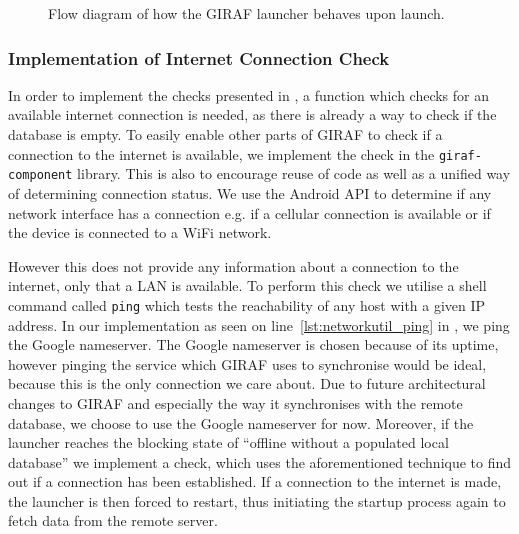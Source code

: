 \begin{figure}[h]
    \centering
    
    \caption{Flow diagram of how the GIRAF launcher behaves upon launch.}\label{fig:launcher_offline_flow}
\end{figure}

\subsubsection{Implementation of Internet Connection Check}
In order to implement the checks presented in , a function which checks for an available internet connection is needed, as there is already a way to check if the database is empty.
To easily enable other parts of GIRAF to check if a connection to the internet is available, we implement the check in the \texttt{giraf-component} library.
This is also to encourage reuse of code as well as a unified way of determining connection status.
We use the Android API to determine if any network interface has a connection e.g. if a cellular connection is available or if the device is connected to a WiFi network.

However this does not provide any information about a connection to the internet, only that a LAN is available.
To perform this check we utilise a shell command called \texttt{ping} which tests the reachability of any host with a given IP address.
In our implementation as seen on line~\ref{lst:networkutil_ping} in , we ping the Google nameserver.
The Google nameserver is chosen because of its uptime, however pinging the service which GIRAF uses to synchronise would be ideal, because this is the only connection we care about.
Due to future architectural changes to GIRAF and especially the way it synchronises with the remote database, we choose to use the Google nameserver for now.
Moreover, if the launcher reaches the blocking state of \enquote{offline without a populated local database} we implement a check, which uses the aforementioned technique to find out if a connection has been established.
If a connection to the internet is made, the launcher is then forced to restart, thus initiating the startup process again to fetch data from the remote server.

